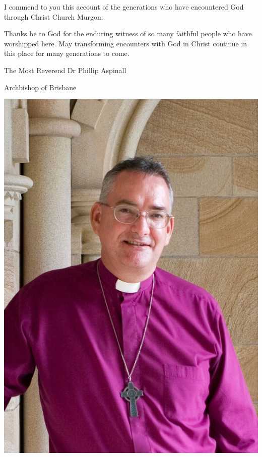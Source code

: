 \documentclass[a4paper,11pt,parskip=never,DIV=8,chapterprefix=true,titlepage=true,twoside,twocolumn,open=any]{scrbook}
\begin{document}
\bigskip

\noindent
\begin{minipage}[b]{1.1\linewidth}%
\begin{minipage}[b]{0.70\linewidth}%

I commend to you this account of the generations who have encountered God through 
Christ Church Murgon.

\smallskip
Thanks be to God for the enduring witness of so many faithful people who have worshipped here. 
May transforming encounters with God in Christ continue in this place for many generations to come.

\vspace{1cm}%
\noindent The Most Reverend Dr Phillip Aspinall

\vspace{5mm}%
\noindent Archbishop of Brisbane
\end{minipage}%
\hspace{2em}
\begin{minipage}[b]{.19\linewidth}%
\begin{center}%
\includegraphics[width=\linewidth,right]{../images/abpPhoto.jpg}
\end{center}%
\end{minipage}%
\end{minipage}%
\end{document}
